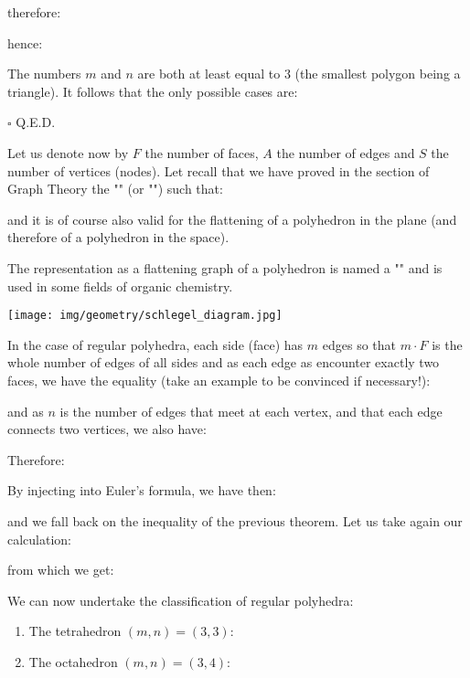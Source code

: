 {\begin{dem}
	therefore:
	
	hence:
	
	The numbers $m$ and $n$ are both at least equal to $3$ (the smallest polygon being a triangle). It follows that the only possible cases are:
		
	\begin{flushright}
		$\square$  Q.E.D.
	\end{flushright}
	\end{dem}

	Let us denote now by $F$ the number of faces, $A$ the number of edges and $S$ the number of vertices (nodes). Let recall that we have proved in the section of Graph Theory the "" (or "") such that:	
	
	and it is of course also valid for the flattening of a polyhedron in the plane (and therefore of a polyhedron in the space).
	\begin{tcolorbox}[title=Remark,colframe=black,arc=10pt]
	The representation as a flattening graph of a polyhedron is named a "" and is used in some fields of organic chemistry.
	\begin{center}
		\texttt{[image: img/geometry/schlegel\_diagram.jpg]}
	\end{center}
	\end{tcolorbox}	
	In the case of regular polyhedra, each side (face) has $m$ edges so that $m\cdot F$ is the whole number of edges of all sides and as each edge as encounter exactly two faces, we have the equality (take an example to be convinced if necessary!):
	
	and as $n$ is the number of edges that meet at each vertex, and that each edge connects two vertices, we also have:
	
	Therefore:
	
	By injecting into Euler's formula, we have then:
	
	and we fall back on the inequality of the previous theorem. Let us take again our calculation:
	
	from which we get:
	
	We can now undertake the classification of regular polyhedra:
	\begin{enumerate}
		\item The tetrahedron $(m,n)=(3,3)$:
		
		
		\item The octahedron $(m,n)=(3,4)$:
		

\end{enumerate}}
